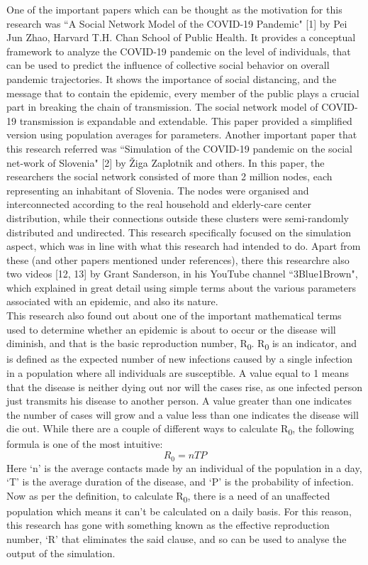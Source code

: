 \documentclass[conference]{IEEEtran}
\begin{document}
    One of the important papers which can be thought as the motivation for this research was ``A Social Network Model of the COVID-19 Pandemic" [1] by Pei Jun Zhao, Harvard T.H. Chan School of Public Health. It provides a conceptual framework to analyze the COVID-19 pandemic on the level of individuals, that can be used to predict the influence of collective social behavior on overall pandemic trajectories. It shows the importance of social distancing, and the message that to contain the epidemic, every member of the public plays a crucial part in breaking the chain of transmission. The social network model of COVID-19 transmission is expandable and extendable. This paper provided a simplified version using population averages for parameters. Another important paper that this research referred was ``Simulation  of  the  COVID-19  pandemic  on  the  social  net-work  of  Slovenia" [2] by Žiga Zaplotnik and others. In this paper, the researchers the social network consisted of more than 2 million nodes, each representing an inhabitant of Slovenia. The nodes were organised and interconnected according to the real household and elderly-care center distribution, while their connections outside these clusters were semi-randomly distributed and undirected. This research specifically focused on the simulation aspect, which was in line with what this research had intended to do. Apart from these (and other papers mentioned under references), there this researchre also two videos [12, 13] by Grant Sanderson, in his YouTube channel ``3Blue1Brown", which explained in great detail using simple terms about the various parameters associated with an epidemic, and also its nature.\\
    
    This research also found out about one of the important mathematical terms used to determine whether an epidemic is about to occur or the disease will diminish, and that is the basic reproduction number, R\textsubscript{0}. R\textsubscript{0} is an indicator, and is defined as the expected number of new infections caused by a single infection in a population where all individuals are susceptible. A value equal to 1 means that the disease is neither dying out nor will the cases rise, as one infected person just transmits his disease to another person. A value greater than one indicates the number of cases will grow and a value less than one indicates the disease will die out. While there are a couple of different ways to calculate R\textsubscript{0}, the following formula is one of the most intuitive: \[R_0 = nTP\] Here `n' is the average contacts made by an individual of the population in a day, `T' is the average duration of the disease, and `P' is the probability of infection. Now as per the definition, to calculate R\textsubscript{0}, there is a need of an unaffected population which means it can't be calculated on a daily basis. For this reason, this research has gone with something known as the effective reproduction number, `R' that eliminates the said clause, and so can be used to analyse the output of the simulation.\\
    
\end{document}
